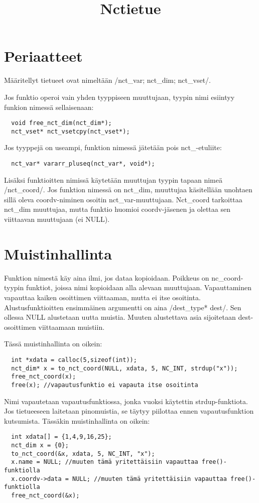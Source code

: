 \documentclass{scrartcl}
\title{Nctietue}
\begin{document}
\maketitle

\section{Periaatteet}
Määritellyt tietueet ovat nimeltään \cinline/nct_var; nct_dim; nct_vset/.

Jos funktio operoi vain yhden tyyppiseen muuttujaan, tyypin nimi esiintyy funkion nimessä sellaisenaan:
\begin{verbatim}
  void free_nct_dim(nct_dim*);
  nct_vset* nct_vsetcpy(nct_vset*);
\end{verbatim}
Jos tyyppejä on useampi, funktion nimessä jätetään pois nct\_-etuliite:
\begin{verbatim}
  nct_var* vararr_pluseq(nct_var*, void*);
\end{verbatim}

Lisäksi funktioitten nimissä käytetään muuttujan tyypin tapaan nimeä \cinline/nct_coord/.
Jos funktion nimessä on nct\_dim, muuttujaa käsitellään unohtaen sillä oleva coordv-niminen osoitin nct\_var-muuttujaan.
Nct\_coord tarkoittaa nct\_dim muuttujaa, mutta funktio huomioi coordv-jäsenen ja olettaa sen viittaavan muuttujaan (ei NULL).

\section{Muistinhallinta}
Funktion nimestä käy aina ilmi, jos dataa kopioidaan.
Poikkeus on nc\_coord-tyypin funktiot, joissa nimi kopioidaan alla alevaan muuttujaan.
Vapauttaminen vapauttaa kaiken osoittimen viittaaman, mutta ei itse osoitinta.
Alustusfunktioitten ensimmäinen argumentti on aina \cinline/dest_type* dest/.
Sen ollessa NULL alustetaan uutta muistia.
Muuten alustettava asia sijoitetaan dest-osoittimen viittaamaan muistiin.

Tässä muistinhallinta on oikein:
\begin{verbatim}
  int *xdata = calloc(5,sizeof(int));
  nct_dim* x = to_nct_coord(NULL, xdata, 5, NC_INT, strdup("x"));
  free_nct_coord(x);
  free(x); //vapautusfunktio ei vapauta itse osoitinta
\end{verbatim}
Nimi vapautetaan vapautusfunktiossa, jonka vuoksi käytettin strdup-funktiota.
Jos tietueeseen laitetaan pinomuistia, se täytyy piilottaa ennen vapautusfunktion kutsumista.
Tässäkin muistinhallinta on oikein:
\begin{verbatim}
  int xdata[] = {1,4,9,16,25};
  nct_dim x = {0};
  to_nct_coord(&x, xdata, 5, NC_INT, "x");
  x.name = NULL; //muuten tämä yritettäisiin vapauttaa free()-funktiolla
  x.coordv->data = NULL; //muuten tämä yritettäisiin vapauttaa free()-funktiolla
  free_nct_coord(&x);
\end{verbatim}
\end{document}
